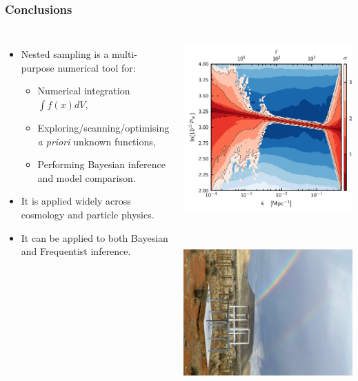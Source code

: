 \documentclass[aspectratio=169]{beamer}
\begin{document}
\begin{frame}
    \frametitle{Conclusions}
    \begin{columns}
    \begin{itemize}
        \item Nested sampling is a multi-purpose numerical tool for:
            \begin{itemize}
                \item Numerical integration $\int f(x) dV$,
                \item Exploring/scanning/optimising \textit{a priori} unknown functions,
                \item Performing Bayesian inference and model comparison.
            \end{itemize}
        \item It is applied widely across cosmology and particle physics.
        \item It can be applied to both Bayesian and Frequentist inference.
    \end{itemize}
    \includegraphics[height=0.6\textwidth]{figures/pps_both}%
    \includegraphics[height=0.6\textwidth]{figures/REACH_2}%

\end{columns}
\end{frame}
\end{document}
